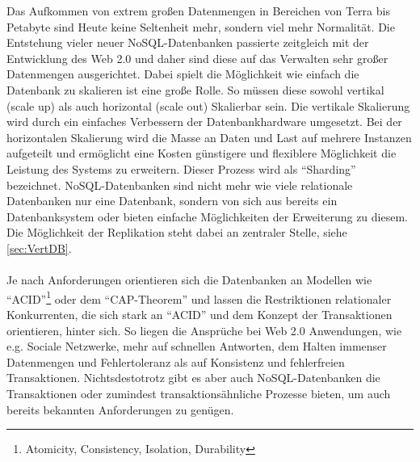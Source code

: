 \documentclass[a4paper,11pt,oneside,%
headsepline,												%
footsepline,												%
bibtotocnumbered									%
]{scrreprt}
\begin{document}
Das Aufkommen von extrem großen Datenmengen in Bereichen von Terra bis Petabyte sind Heute keine Seltenheit mehr, sondern viel mehr Normalität. Die Entstehung vieler neuer NoSQL-Datenbanken passierte zeitgleich mit der Entwicklung des Web 2.0 und daher sind diese auf das Verwalten sehr großer Datenmengen ausgerichtet.
Dabei spielt die Möglichkeit wie einfach die Datenbank zu skalieren ist eine große Rolle. So müssen diese sowohl vertikal (scale up) als auch horizontal (scale out) Skalierbar sein. Die vertikale Skalierung wird durch ein einfaches Verbessern der Datenbankhardware umgesetzt. Bei der horizontalen Skalierung wird die Masse an Daten und Last auf mehrere Instanzen aufgeteilt und ermöglicht eine Kosten günstigere und flexiblere Möglichkeit die Leistung des Systems zu erweitern. Dieser Prozess wird als \enquote{Sharding} bezeichnet.
NoSQL-Datenbanken sind nicht mehr wie viele relationale Datenbanken nur eine Datenbank, sondern von sich aus bereits ein Datenbanksystem oder bieten einfache Möglichkeiten der Erweiterung zu diesem. Die Möglichkeit der Replikation steht dabei an zentraler Stelle, siehe \autoref{sec:VertDB}.\\\\
Je nach Anforderungen orientieren sich die Datenbanken an Modellen wie \enquote{ACID}\footnote{Atomicity, Consistency, Isolation, Durability} oder dem \enquote{CAP-Theorem} und lassen die Restriktionen relationaler Konkurrenten, die sich stark an \enquote{ACID} und dem Konzept der Transaktionen orientieren, hinter sich. So liegen die Ansprüche bei Web 2.0 Anwendungen, wie e.g. Sociale Netzwerke, mehr auf schnellen Antworten, dem Halten immenser Datenmengen und Fehlertoleranz als auf Konsistenz und fehlerfreien Transaktionen.
Nichtsdestotrotz gibt es aber auch NoSQL-Datenbanken die Transaktionen oder  zumindest transaktionsähnliche Prozesse bieten, um auch bereits bekannten Anforderungen zu genügen.
\end{document}
